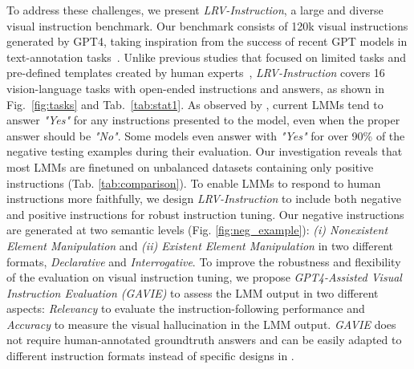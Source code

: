 To address these challenges, we present \textit{LRV-Instruction}, a large and diverse visual instruction benchmark. Our benchmark consists of 120k visual instructions generated by GPT4, taking inspiration from the success of recent GPT models in text-annotation tasks~\cite{liu2023gpteval}. Unlike previous studies that focused on limited tasks and pre-defined templates created by human experts~\cite{zhu2023minigpt, dai2023instructblip, gong2023multimodal}, \textit{LRV-Instruction} covers 16 vision-language tasks with open-ended instructions and answers, as shown in Fig.~\ref{fig:tasks} and Tab.~\ref{tab:stat1}. As observed by \cite{li2023evaluating}, current LMMs tend to answer \textit{"Yes"} for any instructions presented to the model, even when the proper answer should be \textit{"No"}. Some models even answer with \textit{"Yes"} for over 90\% of the negative testing examples during their evaluation. Our investigation reveals that most LMMs are finetuned on unbalanced datasets containing only positive instructions (Tab. \ref{tab:comparison}). To enable LMMs to respond to human instructions more faithfully, we design \textit{LRV-Instruction} to include both negative and positive instructions for robust instruction tuning. Our negative instructions are generated at two semantic levels (Fig. \ref{fig:neg_example}): \textit{(i) Nonexistent Element Manipulation} and \textit{(ii) Existent Element Manipulation} in two different formats, \textit{Declarative} and \textit{Interrogative}. To improve the robustness and flexibility of the evaluation on visual instruction tuning, we propose \textit{GPT4-Assisted Visual Instruction Evaluation (GAVIE)} to assess the LMM output in two different aspects: \textit{Relevancy} to evaluate the instruction-following performance and \textit{Accuracy} to measure the visual hallucination in the LMM output. \textit{GAVIE} does not require human-annotated groundtruth answers \cite{rohrbach2018object} and can be easily adapted to different instruction formats instead of specific designs in \cite{li2023evaluating}.

